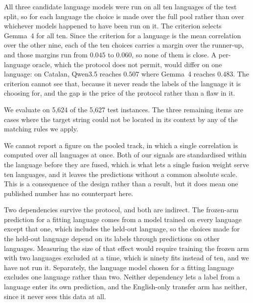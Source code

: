 All three candidate language models were run on all ten languages of
the test split, so for each language the choice is made over the full
pool rather than over whichever models happened to have been run on it.
The criterion selects Gemma~4 for all ten. Since the criterion for a
language is the mean correlation over the other nine, each of the ten
choices carries a margin over the runner-up, and those margins run from
$0.045$ to $0.060$, so none of them is close. A per-language oracle,
which the protocol does not permit, would differ on one language: on
Catalan, Qwen3.5 reaches $0.507$ where Gemma~4 reaches $0.483$. The
criterion cannot see that, because it never reads the labels of the
language it is choosing for, and the gap is the price of the protocol
rather than a flaw in it.

We evaluate on 5{,}624 of the 5{,}627 test instances. The three
remaining items are cases where the target string could not be located
in its context by any of the matching rules we apply.

We cannot report a figure on the pooled track, in which a single
correlation is computed over all languages at once. Both of our signals
are standardised within the language before they are fused, which is
what lets a single fusion weight serve ten languages, and it leaves the
predictions without a common absolute scale. This is a consequence of
the design rather than a result, but it does mean one published number
has no counterpart here.

Two dependencies survive the protocol, and both are indirect. The
frozen-arm prediction for a fitting language comes from a model trained
on every language except that one, which includes the held-out language,
so the choices made for the held-out language depend on its labels
through predictions on other languages. Measuring the size of that
effect would require training the frozen arm with two languages excluded
at a time, which is ninety fits instead of ten, and we have not run it.
Separately, the language model chosen for a fitting language excludes
one language rather than two. Neither dependency lets a label from a
language enter its own prediction, and the English-only transfer arm has
neither, since it never sees this data at all.





